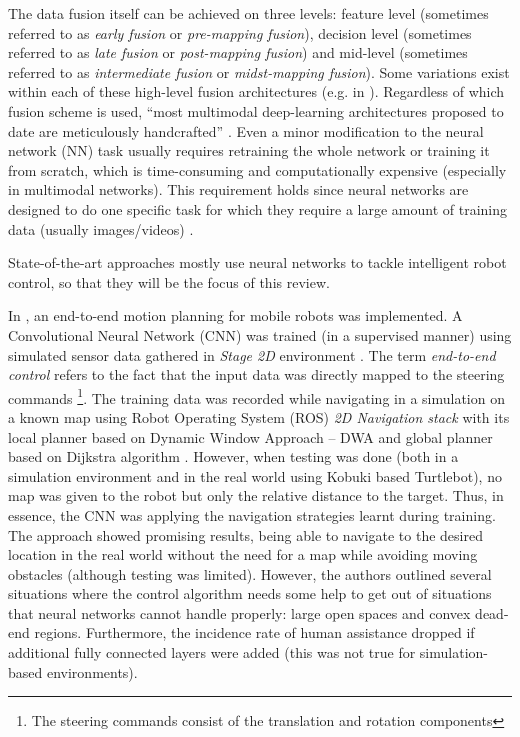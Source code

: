 The data fusion itself can be achieved on three levels\cite{Ramachandram2017,Toprak2017}: feature level (sometimes referred to as \emph{early fusion} or \emph{pre-mapping fusion}), decision level (sometimes referred to as \emph{late fusion} or \emph{post-mapping fusion}) and mid-level (sometimes referred to as \emph{intermediate fusion} or \emph{midst-mapping fusion}). Some variations exist within each of these high-level fusion architectures (e.g. in \cite{Chou2018}). Regardless of which fusion scheme is used, ``most multimodal deep-learning architectures proposed to date are meticulously handcrafted'' \cite{Ramachandram2017}. Even a minor modification to the neural network (NN) task usually requires retraining the whole network or training it from scratch, which is time-consuming and computationally expensive (especially in multimodal networks). This requirement holds since neural networks are designed to do one specific task for which they require a large amount of training data (usually images/videos) \cite{Ahmad2005}.

State-of-the-art approaches mostly use neural networks to tackle intelligent robot control, so that they will be the focus of this review. 

In \cite{Pfeiffer2017}, an end-to-end motion planning for mobile robots was implemented. A Convolutional Neural Network (CNN) was trained (in a supervised manner) using simulated sensor data gathered in \emph{Stage 2D} environment \cite{Vaughan2008}. The term \emph{end-to-end control} refers to the fact that the input data was directly mapped to the steering commands \footnote{The steering commands consist of the translation and rotation components}. The training data was recorded while navigating in a simulation on a known map using Robot Operating System (ROS) \cite{Quigley2009} \emph{2D Navigation stack} with its local planner based on Dynamic Window Approach -- DWA \cite{Fox1997} and global planner based on Dijkstra algorithm \cite{Dijkstra1959}. However, when testing was done (both in a simulation environment and in the real world using Kobuki based Turtlebot), no map was given to the robot but only the relative distance to the target. Thus, in essence, the CNN was applying the navigation strategies learnt during training. The approach showed promising results, being able to navigate to the desired location in the real world without the need for a map while avoiding moving obstacles (although testing was limited). However, the authors outlined several situations where the control algorithm needs some help to get out of situations that neural networks cannot handle properly: large open spaces and convex dead-end regions. Furthermore, the incidence rate of human assistance dropped if additional fully connected layers were added (this was not true for simulation-based environments).

